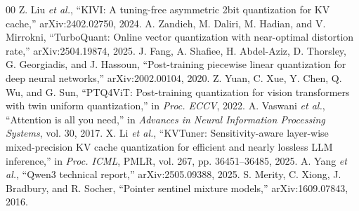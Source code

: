 \documentclass[conference,a4paper,10pt]{IEEEtran}
\begin{document}
\begin{thebibliography}{00}
 Z. Liu \emph{et al.}, ``KIVI: A tuning-free asymmetric 2bit quantization for KV cache,'' arXiv:2402.02750, 2024.
 A. Zandieh, M. Daliri, M. Hadian, and V. Mirrokni, ``TurboQuant: Online vector quantization with near-optimal distortion rate,'' arXiv:2504.19874, 2025.
 J. Fang, A. Shafiee, H. Abdel-Aziz, D. Thorsley, G. Georgiadis, and J. Hassoun, ``Post-training piecewise linear quantization for deep neural networks,'' arXiv:2002.00104, 2020.
 Z. Yuan, C. Xue, Y. Chen, Q. Wu, and G. Sun, ``PTQ4ViT: Post-training quantization for vision transformers with twin uniform quantization,'' in \emph{Proc. ECCV}, 2022.
 A. Vaswani \emph{et al.}, ``Attention is all you need,'' in \emph{Advances in Neural Information Processing Systems}, vol. 30, 2017.
 X. Li \emph{et al.}, ``KVTuner: Sensitivity-aware layer-wise mixed-precision KV cache quantization for efficient and nearly lossless LLM inference,'' in \emph{Proc. ICML}, PMLR, vol. 267, pp. 36451--36485, 2025.
 A. Yang \emph{et al.}, ``Qwen3 technical report,'' arXiv:2505.09388, 2025.
 S. Merity, C. Xiong, J. Bradbury, and R. Socher, ``Pointer sentinel mixture models,'' arXiv:1609.07843, 2016.
\end{thebibliography}
\end{document}
